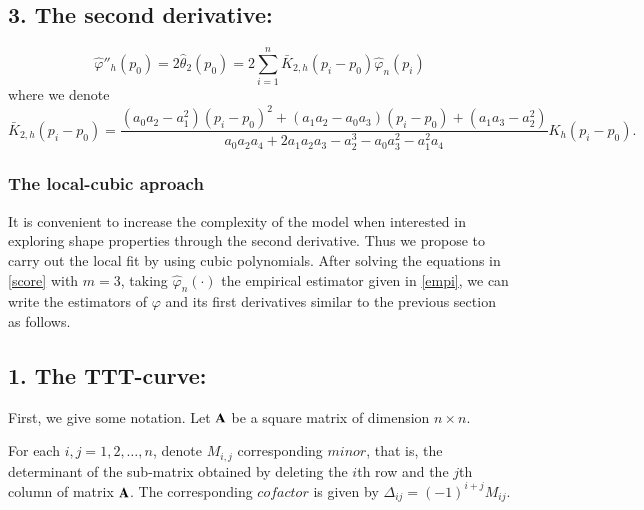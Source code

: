 \documentclass[preprint,12pt]{elsarticle}
\begin{document}
\subsection*{3. The second derivative: }
\begin{equation}\label{theta2}
\widehat{\varphi}''_h(p_0)=2 \widehat{\theta}_2(p_0) =2 \sum_{i=1}^n \bar{{K}}_{2,h}\left(p_i-p_0\right) \widehat{\varphi}_n(p_i)
\end{equation}
where we denote
\[
\bar{{K}}_{2,h}\left(p_i-p_0\right)=\frac{\left(a_0a_2-a_1^2\right)\left(p_i-p_0\right)^2+\left(a_1a_2-a_0a_3\right)\left(p_i-p_0\right)+\left(a_1a_3-a_2^2\right)}{a_0a_2a_4+2a_1a_2a_3-a_2^3-a_0a_3^2-a_1^2a_4} K_h\left(p_i-p_0\right).
\]
\bigskip

\subsubsection{The local-cubic aproach}
\noindent It is convenient to increase the complexity of the model when interested in exploring shape properties through the second derivative.
 Thus we propose to carry out the local fit by using cubic polynomials. After solving the equations in \eqref{score} with $m=3$, taking  $\widehat{\varphi}_n\left(\cdot\right)$ the empirical estimator given in \eqref{empi}, we can write the estimators of $\varphi$ and its first derivatives similar to the previous section as follows.

%

\subsection*{1. The TTT-curve: }%

\noindent First, we give some notation. Let ${\bf A}$ be a square matrix of dimension $n \times n$. 

For each $i, j =1,2,\ldots, n$, denote $M_{i,j}$ corresponding $minor$, that is, the determinant of the sub-matrix obtained by deleting the $i$th row and the $j$th column of matrix ${\bf A}$. The corresponding $cofactor$ is given by  $\Delta_{ij}=(-1)^{i+j} M_{ij}$. 
\end{document}
